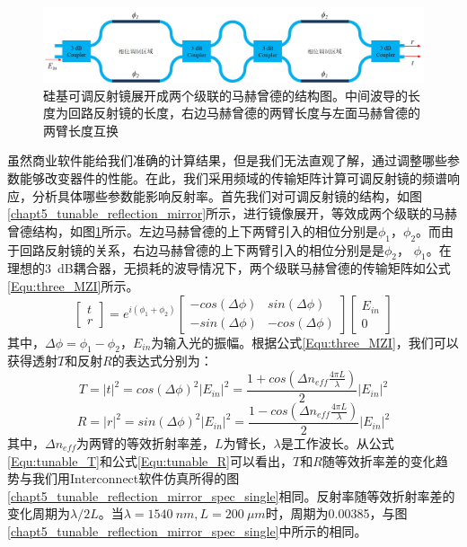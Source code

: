 \begin{figure}[htb]
	\centering
	\includegraphics[width=15cm]{./Pictures/chapt5_tunable_reflection_mirror_flatten.jpg}
	\caption{硅基可调反射镜展开成两个级联的马赫曾德的结构图。中间波导的长度为回路反射镜的长度，右边马赫曾德的两臂长度与左面马赫曾德的两臂长度互换}
	\label{chapt5_tunable_reflection_mirror_flatten}
\end{figure}
虽然商业软件能给我们准确的计算结果，但是我们无法直观了解，通过调整哪些参数能够改变器件的性能。在此，我们采用频域的传输矩阵计算可调反射镜的频谱响应，分析具体哪些参数能影响反射率。首先我们对可调反射镜的结构，如图\ref{chapt5_tunable_reflection_mirror}所示，进行镜像展开，等效成两个级联的马赫曾德结构，如图\ref{chapt5_tunable_reflection_mirror_flatten}所示。左边马赫曾德的上下两臂引入的相位分别是$\phi_1$，$\phi_2$。而由于回路反射镜的关系，右边马赫曾德的上下两臂引入的相位分别是是$\phi_2$， $\phi_1$。在理想的3~dB耦合器，无损耗的波导情况下，两个级联马赫曾德的传输矩阵如公式\ref{Equ:three_MZI}所示。
\begin{equation}
\label{Equ:three_MZI}
\begin{bmatrix}
t\\
r
\end{bmatrix}
= e^{i(\phi_1+\phi_2)}
\begin{bmatrix}
-cos(\Delta \phi) & sin(\Delta \phi)\\
-sin(\Delta \phi) & -cos(\Delta \phi)
\end{bmatrix}
\begin{bmatrix}
E_{in}\\
0
\end{bmatrix}
\end{equation}
其中，$\Delta \phi = \phi_1-\phi_2$，$E_{in}$为输入光的振幅。根据公式\ref{Equ:three_MZI}，我们可以获得透射$T$和反射$R$的表达式分别为：
\begin{equation}
\label{Equ:tunable_T}
T = |t|^2 = cos(\Delta \phi)^2 |E_{in}|^2 = \frac{1+cos(\Delta n_{eff}\frac{4\pi L}{\lambda})}{2}|E_{in}|^2
\end{equation}
\begin{equation}
\label{Equ:tunable_R}
R = |r|^2 = sin(\Delta \phi)^2 |E_{in}|^2= \frac{1-cos(\Delta n_{eff}\frac{4\pi L}{\lambda})}{2}|E_{in}|^2
\end{equation}
其中，$\Delta n_{eff}$为两臂的等效折射率差，$L$为臂长，$\lambda$是工作波长。从公式\ref{Equ:tunable_T}和公式\ref{Equ:tunable_R}可以看出，$T$和$R$随等效折率差的变化趋势与我们用Interconnect软件仿真所得的图\ref{chapt5_tunable_reflection_mirror_spec_single}相同。反射率随等效折射率差的变化周期为$\lambda/2L$。当$\lambda = 1540~nm, L = 200~\mu m$时，周期为0.00385，与图\ref{chapt5_tunable_reflection_mirror_spec_single}中所示的相同。

